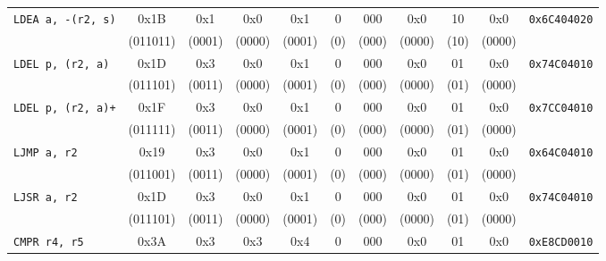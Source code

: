 \begin{table}[H]
\begin{tabular}{lcccccccccc}
		\midrule
		\texttt{LDEA a, -(r2, s)}           & 0x1B        & 0x1         & 0x0         & 0x1         & 0           & 000         & 0x0         & 10          & 0x0           & \texttt{0x6C404020} \\
		                                    & (011011)    & (0001)      & (0000)      & (0001)      & (0)         & (000)       & (0000)      & (10)        & (0000)        &                     \\
		\midrule
		\texttt{LDEL p, (r2, a)}            & 0x1D        & 0x3         & 0x0         & 0x1         & 0           & 000         & 0x0         & 01          & 0x0           & \texttt{0x74C04010} \\
		                                    & (011101)    & (0011)      & (0000)      & (0001)      & (0)         & (000)       & (0000)      & (01)        & (0000)        &                     \\
		\midrule
		\texttt{LDEL p, (r2, a)+}           & 0x1F        & 0x3         & 0x0         & 0x1         & 0           & 000         & 0x0         & 01          & 0x0           & \texttt{0x7CC04010} \\
		                                    & (011111)    & (0011)      & (0000)      & (0001)      & (0)         & (000)       & (0000)      & (01)        & (0000)        &                     \\
		\midrule
		\texttt{LJMP a, r2}                 & 0x19        & 0x3         & 0x0         & 0x1         & 0           & 000         & 0x0         & 01          & 0x0           & \texttt{0x64C04010} \\
		                                    & (011001)    & (0011)      & (0000)      & (0001)      & (0)         & (000)       & (0000)      & (01)        & (0000)        &                     \\
		\midrule
		\texttt{LJSR a, r2}                 & 0x1D        & 0x3         & 0x0         & 0x1         & 0           & 000         & 0x0         & 01          & 0x0           & \texttt{0x74C04010} \\
		                                    & (011101)    & (0011)      & (0000)      & (0001)      & (0)         & (000)       & (0000)      & (01)        & (0000)        &                     \\
		\midrule
		\texttt{CMPR r4, r5}                & 0x3A        & 0x3         & 0x3         & 0x4         & 0           & 000         & 0x0         & 01          & 0x0           & \texttt{0xE8CD0010} \\

\end{tabular}
\end{table}
